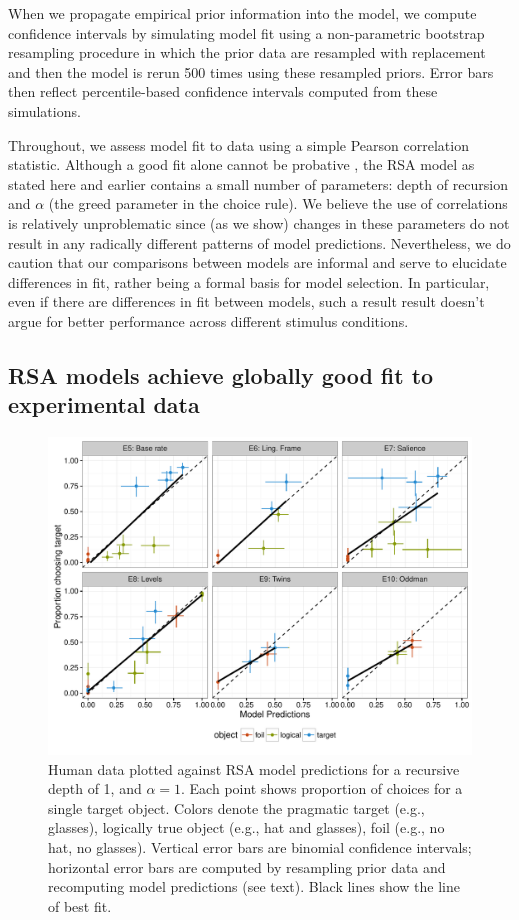 \documentclass[man,noapacite]{apa2}
\begin{document}
When we propagate empirical prior information into the model, we compute confidence intervals by simulating model fit using a non-parametric bootstrap resampling procedure in which the prior data are resampled with replacement and then the model is rerun 500 times using these resampled priors. Error bars then reflect percentile-based confidence intervals computed from these simulations.

Throughout, we assess model fit to data using a simple Pearson correlation statistic. Although a good fit alone cannot be probative \cite{roberts2000}, the RSA model as stated here and earlier contains a small number of parameters: depth of recursion and $\alpha$ (the greed parameter in the choice rule). We believe the use of correlations is relatively unproblematic since (as we show) changes in these parameters do not result in any radically different patterns of model predictions. Nevertheless, we do caution that our comparisons between models are informal and serve to elucidate differences in fit, rather being a formal basis for model selection. In particular, even if there are differences in fit between models, such a result result doesn't argue for better performance across different stimulus conditions.

\subsection{RSA models achieve globally good fit to experimental data}

\begin{figure}[t]
 \centering
 \includegraphics[width=6in]{../plots/model_basic.pdf}
 \caption{\label{fig:basic} Human data plotted against RSA model predictions for a recursive depth of 1, and $\alpha=1$. Each point shows proportion of choices for a single target object. Colors denote the pragmatic target (e.g., glasses), logically true object (e.g., hat and glasses), foil (e.g., no hat, no glasses). Vertical error bars are binomial confidence intervals; horizontal error bars are computed by resampling prior data and recomputing model predictions (see text). Black lines show the line of best fit.}
\end{figure}
\end{document}
